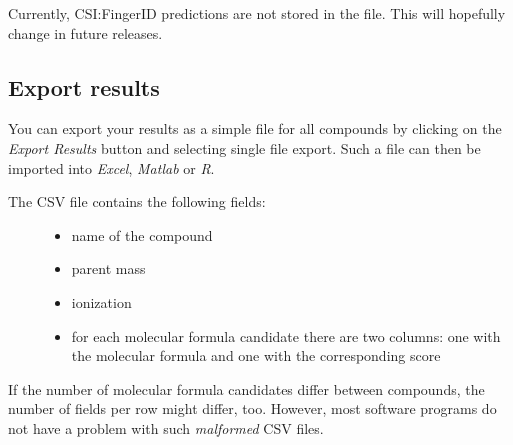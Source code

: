 \documentclass[letterpaper,10pt,openany,oneside]{sphinxmanual}
\newcommand\gui[1]{\textsl{\guilsinglleft#1\guilsinglright\xspace}}
\begin{document}
Currently, CSI:FingerID predictions are not stored in the  file. This will hopefully change in future releases.


\subsection{Export results}
\label{gui:export-results}

You can export your results as a simple  file for all compounds by
clicking on the \gui{Export Results} button and selecting single file
export. Such a  file can then be imported
into \emph{Excel}, \emph{Matlab} or \emph{R}.
%
\begin{description}
\item[{The CSV file contains the following fields:}] \leavevmode\begin{itemize}
\item {} 
name of the compound

\item {} 
parent mass

\item {} 
ionization

\item {} 
for each molecular formula candidate there are two columns: one with the molecular formula and one with the corresponding score

\end{itemize}

\end{description}

If the number of molecular formula candidates differ between compounds, the number of fields per row might differ, too. However, most software programs do not have a problem with such \emph{malformed} CSV files.
\end{document}
